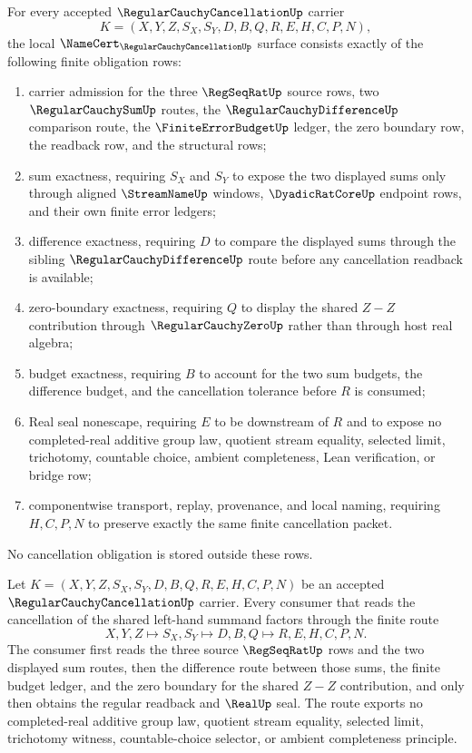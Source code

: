 \begin{theorem}
\label{thm:regular-cauchy-cancellation-namecert-obligations}
For every accepted $\RegularCauchyCancellationUp$ carrier
$$
K=(X,Y,Z,S_X,S_Y,D,B,Q,R,E,H,C,P,N),
$$
the local $\NameCert_{\RegularCauchyCancellationUp}$ surface consists exactly of the following finite obligation rows:
\begin{enumerate}
\item carrier admission for the three $\RegSeqRatUp$ source rows, two $\RegularCauchySumUp$ routes, the $\RegularCauchyDifferenceUp$ comparison route, the $\FiniteErrorBudgetUp$ ledger, the zero boundary row, the readback row, and the structural rows;
\item sum exactness, requiring $S_X$ and $S_Y$ to expose the two displayed sums only through aligned $\StreamNameUp$ windows, $\DyadicRatCoreUp$ endpoint rows, and their own finite error ledgers;
\item difference exactness, requiring $D$ to compare the displayed sums through the sibling $\RegularCauchyDifferenceUp$ route before any cancellation readback is available;
\item zero-boundary exactness, requiring $Q$ to display the shared $Z-Z$ contribution through $\RegularCauchyZeroUp$ rather than through host real algebra;
\item budget exactness, requiring $B$ to account for the two sum budgets, the difference budget, and the cancellation tolerance before $R$ is consumed;
\item Real seal nonescape, requiring $E$ to be downstream of $R$ and to expose no completed-real additive group law, quotient stream equality, selected limit, trichotomy, countable choice, ambient completeness, Lean verification, or bridge row;
\item componentwise transport, replay, provenance, and local naming, requiring $H,C,P,N$ to preserve exactly the same finite cancellation packet.
\end{enumerate}
No cancellation obligation is stored outside these rows.
\end{theorem}

\begin{theorem}
\label{thm:regular-cauchy-cancellation-left-route}
Let $K=(X,Y,Z,S_X,S_Y,D,B,Q,R,E,H,C,P,N)$ be an accepted $\RegularCauchyCancellationUp$ carrier. Every consumer that reads the cancellation of the shared left-hand summand factors through the finite route
$$
X,Y,Z \longmapsto S_X,S_Y \longmapsto D,B,Q \longmapsto R,E,H,C,P,N .
$$
The consumer first reads the three source $\RegSeqRatUp$ rows and the two displayed sum routes, then the difference route between those sums, the finite budget ledger, and the zero boundary for the shared $Z-Z$ contribution, and only then obtains the regular readback and $\RealUp$ seal. The route exports no completed-real additive group law, quotient stream equality, selected limit, trichotomy witness, countable-choice selector, or ambient completeness principle.
\end{theorem}

